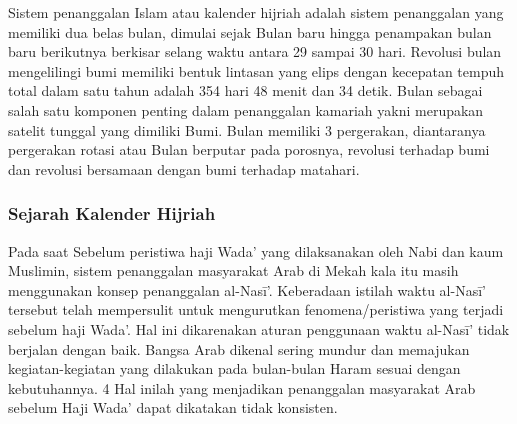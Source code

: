   Sistem penanggalan Islam atau kalender hijriah adalah sistem penanggalan yang memiliki dua belas bulan, dimulai sejak Bulan baru hingga penampakan bulan baru berikutnya berkisar selang waktu antara 29 sampai 30 hari. Revolusi bulan mengelilingi bumi memiliki bentuk lintasan yang elips dengan kecepatan tempuh total dalam satu tahun adalah 354 hari 48 menit dan 34 detik.
  Bulan sebagai salah satu komponen penting dalam penanggalan kamariah yakni merupakan satelit tunggal yang dimiliki Bumi. Bulan memiliki 3 pergerakan, diantaranya pergerakan rotasi atau Bulan berputar pada porosnya, revolusi terhadap bumi dan revolusi bersamaan dengan bumi terhadap matahari.

    \subsubsection{Sejarah Kalender Hijriah}\cite{setyanto2015kriteria}
      Pada saat Sebelum peristiwa haji Wada’ yang dilaksanakan oleh Nabi dan kaum Muslimin, sistem penanggalan masyarakat Arab di Mekah kala itu masih menggunakan konsep penanggalan al-Nasī’. Keberadaan istilah waktu al-Nasī’ tersebut telah mempersulit untuk mengurutkan fenomena/peristiwa yang terjadi sebelum haji Wada’.
    Hal ini dikarenakan aturan penggunaan waktu al-Nasī’ tidak berjalan dengan baik. Bangsa Arab dikenal sering mundur dan memajukan kegiatan-kegiatan yang dilakukan pada bulan-bulan Haram sesuai dengan kebutuhannya. 4 Hal inilah yang menjadikan penanggalan masyarakat Arab sebelum Haji Wada’ dapat dikatakan tidak konsisten.

